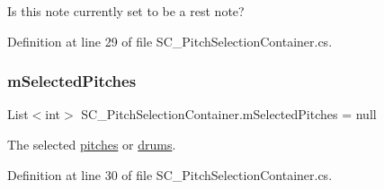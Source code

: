 Is this note currently set to be a rest note? 



Definition at line 29 of file S\+C\+\_\+\+Pitch\+Selection\+Container.\+cs.

\mbox{\label{group___s_c___p_s_c_priv_var_ga5a8a5c31158f6af7f0c17d4fd03c5641}} 
\subsubsection{\texorpdfstring{m\+Selected\+Pitches}{mSelectedPitches}}
{\footnotesize\ttfamily List$<$int$>$ S\+C\+\_\+\+Pitch\+Selection\+Container.\+m\+Selected\+Pitches = null\hspace{0.3cm}{\ttfamily [private]}}



The selected \hyperlink{group___music_enums_ga508f69b199ea518f935486c990edac1d}{pitches} or \hyperlink{group___music_enums_gade475b4382c7066d1af13e7c13c029b6}{drums}. 



Definition at line 30 of file S\+C\+\_\+\+Pitch\+Selection\+Container.\+cs.

